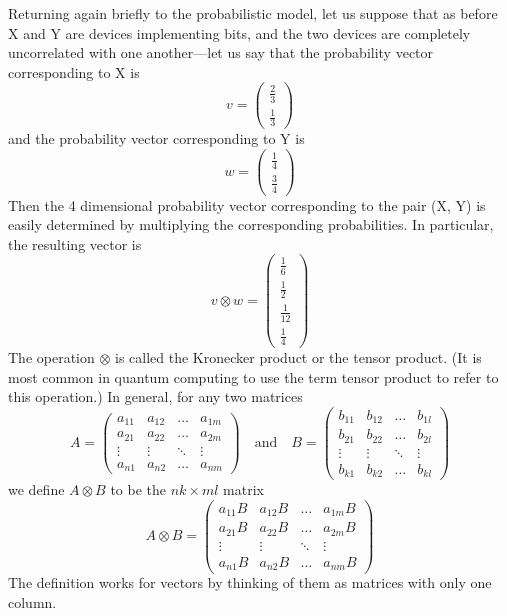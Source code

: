 \documentclass[12pt, oneside]{book}
\theoremstyle{definition}
\theoremstyle{definition}
\theoremstyle{remark}
\begin{document}
Returning again briefly to the probabilistic model, let us suppose that as before X and Y are devices
implementing bits, and the two devices are completely uncorrelated with one another—let us say
that the probability vector corresponding to X is
\[
v=\begin{pmatrix} \frac{2}{3} \\ \frac{1}{3} \end{pmatrix}
\]
and the probability vector corresponding to Y is
\[
w=\begin{pmatrix} \frac{1}{4} \\ \frac{3}{4} \end{pmatrix}
\]
Then the 4 dimensional probability vector corresponding to the pair (X, Y) is easily determined by
multiplying the corresponding probabilities. In particular, the resulting vector is
\[
v\otimes w= \begin{pmatrix} \frac{1}{6} \\ \frac{1}{2} \\ \frac{1}{12} \\ \frac{1}{4} \end{pmatrix}
\]
The operation $\otimes$ is called the Kronecker product or the tensor product. (It is most common in
quantum computing to use the term tensor product to refer to this operation.) In general, for any
two matrices
\[
A=\begin{pmatrix} a_{11} & a_{12} &\ldots & a_{1m} \\ a_{21} & a_{22} &\ldots &a_{2m} \\ \vdots & \vdots &\ddots & \vdots \\ a_{n1} & a_{n2} &\ldots & a_{nm} \end{pmatrix} \quad \text{and} \quad B=\begin{pmatrix} b_{11} & b_{12} &\ldots & b_{1l} \\ b_{21}& b_{22} & \ldots & b_{2l} \\ \vdots & \vdots & \ddots & \vdots \\ b_{k1} & b_{k2} & \ldots & b_{kl} \end{pmatrix}
\]
we define $A\otimes B$ to be the $nk \times ml$ matrix
\[
A\otimes B=\begin{pmatrix} a_{11}B & a_{12}B &\ldots & a_{1m}B \\ a_{21}B & a_{22}B &\ldots &a_{2m}B \\ \vdots & \vdots &\ddots & \vdots \\ a_{n1} B& a_{n2}B &\ldots & a_{nm}B \end{pmatrix}
\]
The definition works for vectors by thinking of them as matrices with only one column.
\end{document}

